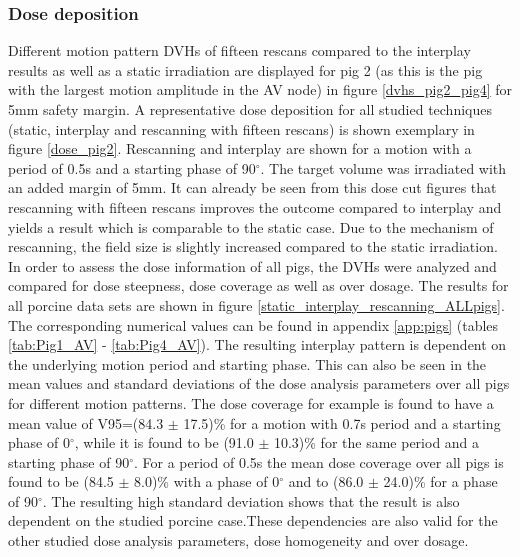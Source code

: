 \subsubsection{Dose deposition}
Different motion pattern DVHs of fifteen rescans compared to the interplay results as well as a static irradiation are displayed for pig 2 
(as this is the pig with the largest motion amplitude in the AV node) in figure \ref{dvhs_pig2_pig4} for 5mm safety margin. 
A representative dose deposition for all studied techniques (static, interplay and rescanning with fifteen rescans) is shown exemplary in 
figure \ref{dose_pig2}. Rescanning and interplay are shown for a motion with a period of 0.5s and a starting phase of 90$^{\circ}$. The target 
volume was irradiated with an added margin of 5mm. It can already be seen from this dose cut figures that rescanning with fifteen rescans 
improves the outcome compared to interplay and yields a result which is comparable to the static case. Due to the mechanism of rescanning, the 
field size is slightly increased compared to the static irradiation.\newline
\newline
In order to assess the dose information of all pigs, the DVHs were analyzed and compared for dose steepness, dose coverage as well as over 
dosage. The results for all porcine data sets are shown in figure \ref{static_interplay_rescanning_ALLpigs}. The corresponding numerical 
values can be found in appendix \ref{app:pigs} (tables \ref{tab:Pig1_AV} - \ref{tab:Pig4_AV}).\newline
\newpage
The resulting interplay pattern is dependent on the underlying motion period and starting phase. This can also be seen in the mean values and 
standard deviations of the dose analysis parameters over all pigs  for different motion patterns. The dose coverage for example is found to 
have a mean value of V95=(84.3 $\pm$ 17.5)\% for a motion with 0.7s period and a starting phase of 0$^{\circ}$, while it is found to be (91.0 
$\pm$ 10.3)\% for the same period and a starting phase of 90$^{\circ}$. For a period of 0.5s the mean dose coverage over all pigs is found to 
be (84.5 $\pm$ 8.0)\% with a phase of 0$^{\circ}$ and to (86.0 $\pm$ 24.0)\% for a phase of 90$^{\circ}$. The resulting high standard deviation 
shows that the result is also dependent on the studied porcine case.These dependencies are also valid for the other studied dose analysis 
parameters, dose homogeneity and over dosage.\newline
\newline

